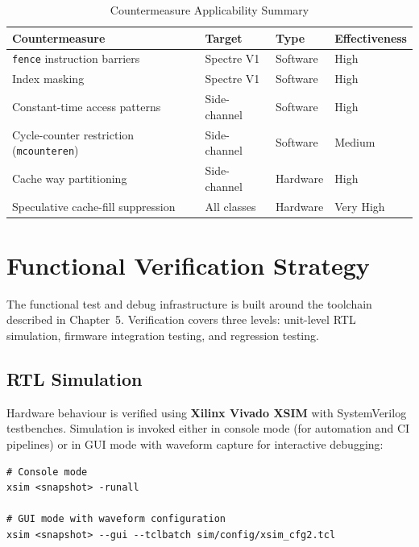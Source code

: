 \begin{table}[h]
\centering
\caption{Countermeasure Applicability Summary}
\label{tab:countermeasures}
\begin{tabular}{llll}
\hline
\textbf{Countermeasure} & \textbf{Target} & \textbf{Type} & \textbf{Effectiveness} \\
\hline
\texttt{fence} instruction barriers  & Spectre V1   & Software & High \\
Index masking                         & Spectre V1   & Software & High \\
Constant-time access patterns         & Side-channel & Software & High \\
Cycle-counter restriction (\texttt{mcounteren}) & Side-channel & Software & Medium \\
Cache way partitioning                & Side-channel & Hardware & High \\
Speculative cache-fill suppression    & All classes  & Hardware & Very High \\
\hline
\end{tabular}
\end{table}

\section{Functional Verification Strategy}

The functional test and debug infrastructure is built around the toolchain described
in Chapter~5.  Verification covers three levels: unit-level RTL simulation, firmware
integration testing, and regression testing.

\subsection{RTL Simulation}

Hardware behaviour is verified using \textbf{Xilinx Vivado XSIM} with SystemVerilog
testbenches.  Simulation is invoked either in console mode (for automation and CI
pipelines) or in GUI mode with waveform capture for interactive debugging:

\begin{verbatim}
# Console mode
xsim <snapshot> -runall

# GUI mode with waveform configuration
xsim <snapshot> --gui --tclbatch sim/config/xsim_cfg2.tcl
\end{verbatim}

